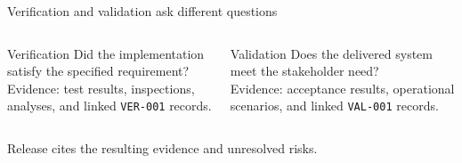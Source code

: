 \begin{frame}{Verification and validation ask different questions}
\begin{columns}[T,onlytextwidth]
\begin{block}{Verification}
Did the implementation satisfy the specified requirement?\\[0.3cm]
Evidence: test results, inspections, analyses, and linked \texttt{VER-001} records.
\end{block}
\begin{block}{Validation}
Does the delivered system meet the stakeholder need?\\[0.3cm]
Evidence: acceptance results, operational scenarios, and linked \texttt{VAL-001} records.
\end{block}
\end{columns}
\vspace{0.4cm}
Release cites the resulting evidence and unresolved risks.
\end{frame}

